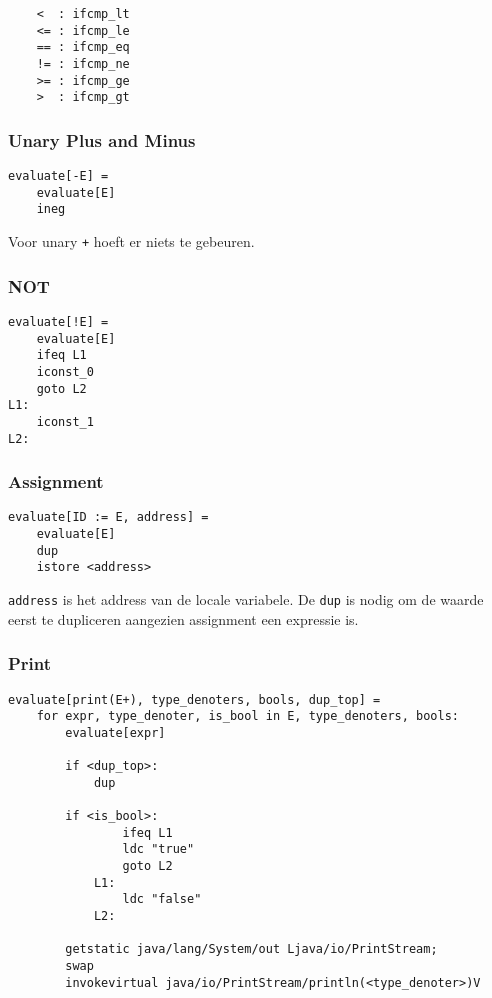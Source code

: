 \documentclass[]{article}
\begin{document}
\begin{verbatim}
	<  : ifcmp_lt
	<= : ifcmp_le
	== : ifcmp_eq
	!= : ifcmp_ne
	>= : ifcmp_ge
	>  : ifcmp_gt
\end{verbatim}

\subsubsection{Unary Plus and Minus}
\begin{verbatim}
evaluate[-E] =
    evaluate[E]
    ineg	
\end{verbatim}

Voor unary \texttt{+} hoeft er niets te gebeuren.

\subsubsection{NOT}
\begin{verbatim}
evaluate[!E] =
    evaluate[E]
    ifeq L1
    iconst_0
    goto L2
L1:
    iconst_1
L2:
\end{verbatim}

\subsubsection{Assignment}
\begin{verbatim}
evaluate[ID := E, address] =
    evaluate[E]
    dup
    istore <address>
\end{verbatim}

\texttt{address} is het address van de locale variabele. De \texttt{dup} is nodig om de waarde eerst te dupliceren aangezien assignment een expressie is.

\subsubsection{Print}
\begin{verbatim}
evaluate[print(E+), type_denoters, bools, dup_top] =
    for expr, type_denoter, is_bool in E, type_denoters, bools:
        evaluate[expr]

        if <dup_top>:
            dup		
		
        if <is_bool>:
                ifeq L1
                ldc "true"
                goto L2
            L1:
                ldc "false"
            L2:
		
        getstatic java/lang/System/out Ljava/io/PrintStream;
        swap
        invokevirtual java/io/PrintStream/println(<type_denoter>)V
\end{verbatim}
\end{document}
